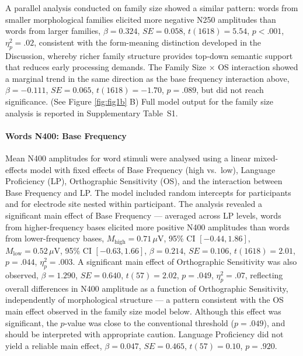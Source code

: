 \documentclass[utf8]{FrontiersinHarvard} %
\begin{document}
	A parallel analysis conducted on family size showed a similar pattern: words from smaller morphological families elicited more negative N250 amplitudes than words from larger families, $\beta = 0.324$, $SE = 0.058$, $t(1618) = 5.54$, $p < .001$, $\eta^2_p = .02$, consistent with the form-meaning distinction developed in the Discussion, whereby richer family structure provides top-down semantic support that reduces early processing demands. The Family Size $\times$ OS interaction showed a marginal trend in the same direction as the base frequency interaction above, $\beta = -0.111$, $SE = 0.065$, $t(1618) = -1.70$, $p = .089$, but did not reach significance.  (See Figure \ref{fig:fig1b} B) Full model output for the family size analysis is reported in Supplementary Table~S1.

	\paragraph*{Words N400: Base Frequency}
	
	Mean N400 amplitudes for word stimuli were analysed using a linear  mixed-effects model with fixed effects of Base Frequency (high vs.\  low), Language Proficiency (LP), Orthographic Sensitivity (OS), and  the interaction between Base Frequency and LP. The model included  random intercepts for participants and for electrode site nested within  participant. The analysis revealed a significant main effect of Base  Frequency --- averaged across LP levels, words from higher-frequency  bases elicited more positive N400 amplitudes than words from  lower-frequency bases, $M_{\mathrm{high}} = 0.71\,\mu$V, 95\% CI  $[-0.44, 1.86]$, $M_{\mathrm{low}} = 0.52\,\mu$V, 95\% CI $[-0.63,  1.66]$, $\beta = 0.214$, $SE = 0.106$, $t(1618) = 2.01$, $p = .044$,  $\eta^2_p = .003$. A significant main effect of Orthographic  Sensitivity was also observed, $\beta = 1.290$, $SE = 0.640$, $t(57)  = 2.02$, $p = .049$, $\eta^2_p = .07$, reflecting overall differences  in N400 amplitude as a function of Orthographic Sensitivity,  independently of morphological structure --- a pattern consistent with  the OS main effect observed in the family size model below. Although  this effect was significant, the $p$-value was close to the  conventional threshold ($p = .049$), and should be interpreted with  appropriate caution. Language Proficiency did not yield a reliable main  effect, $\beta = 0.047$, $SE = 0.465$, $t(57) = 0.10$, $p = .920$.
	
\end{document}
